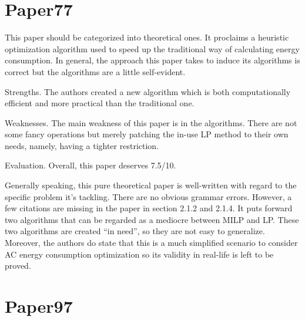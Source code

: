 \documentclass{article}
\begin{document}
\section{Paper77}
\label{sec:paper77}

This paper should be categorized into theoretical ones. It proclaims a
heuristic optimization algorithm used to speed up the traditional way
of calculating energy consumption. In general, the approach this paper
takes to induce its algorithms is correct but the algorithms are a
little self-evident.
\par
Strengths. The authors created a new algorithm which is both
computationally efficient and more practical than the traditional one.
\par
Weaknesses. The main weakness of this paper is in the
algorithms. There are not some fancy operations but merely patching
the in-use LP method to their own needs, namely, having a tighter
restriction. 
\par
Evaluation. Overall, this paper deserves 7.5/10.
\par
Generally speaking, this pure theoretical paper is well-written with
regard to the specific problem it's tackling. There are no obvious
grammar errors. However, a few citations are missing in the paper in
section 2.1.2 and 2.1.4. It puts forward two algorithms that can be
regarded as a mediocre between MILP and LP. These two algorithms are
created ``in need'', so they are not easy to generalize. Moreover, the
authors do state that this is a much simplified scenario to consider
AC energy consumption optimization so its validity in real-life is
left to be proved.

\section{Paper97}
\label{sec:paper97}
\end{document}
